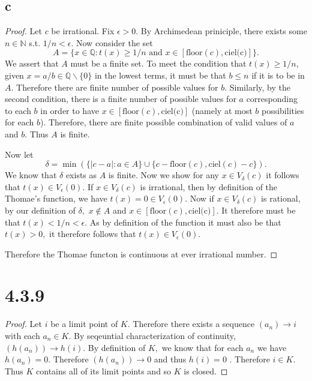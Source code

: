 \documentclass[10pt]{article}
\begin{document}
\subsection*{c}

\begin{proof}
    Let $c$ be irrational. Fix $\epsilon > 0.$ By Archimedean priniciple, there exists some $n\in\mathbb{N}$ s.t. $1/n<\epsilon.$ Now consider the set
    \begin{equation*}
        A = \{x\in\mathbb{Q}: t(x)\ge1/n \text{ and } x\in[\text{floor}(c), \text{ciel(c)}]\}.
    \end{equation*}
    We assert that $A$ must be a finite set. To meet the condition that $t(x)\ge 1/n$, given $x = a/b\in\mathbb{Q}\backslash\{0\}$ in the lowest terms, it must be that $b\le n$ if it is to be in $A.$ Therefore there are finite number of possible values for $b$. Similarly, by the second condition, there is a finite number of possible values for $a$ corresponding to each $b$ in order to have $x\in[\text{floor}(c), \text{ciel(c)}]$ (namely at most $b$ possibilities for each $b$). Therefore, there are finite possible combination of valid values of $a$ and $b$. Thus $A$ is finite.

   Now let
    \begin{equation*}
        \delta = \min(\{|c-a|:a\in A\} \cup \{c-\text{floor}(c),\text{ciel}(c)-c\}).
    \end{equation*}
    We know that $\delta$ exists as $A$ is finite.
    Now we show for any $x\in V_\delta(c)$ it follows that $t(x)\in V_\epsilon(0).$ If $x\in V_\delta(c)$ is irrational, then by definition of the Thomae's function, we have $t(x)=0\in V_\epsilon(0).$ Now if $x\in V_\delta(c)$ is rational, by our definition of $\delta,$ $x\notin A$ and $x\in[\text{floor}(c), \text{ciel(c)}].$ It therefore must be that $t(x) < 1/n <\epsilon.$ As by definition of the function it must also be that $t(x)>0,$ it therefore follows that $t(x)\in V_\epsilon(0).$

    Therefore the Thomae functon is continuous at ever irrational number.
\end{proof}

\section*{4.3.9}

\begin{proof}
    Let $i$ be a limit point of $K$. Therefore there exists a sequence $(a_n)\to i$ with each $a_n\in K.$ By seqeuntial characterization of continuity, $(h(a_n))\to h(i).$ By definition of $K,$ we know that for each $a_n$ we have $h(a_n)=0.$ Therefore $(h(a_n))\to 0$ and thus $h(i)=0$ . Therefore $i\in K.$ Thus $K$ contains all of its limit points and so $K$ is closed.
\end{proof}
\end{document}
